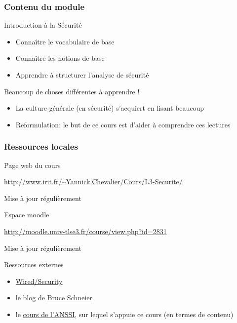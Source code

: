 \begin{reveals}
\begin{frame}
  \frametitle{Contenu du module}

  \vfill
  
  \begin{block}{Introduction à la Sécurité}
    \begin{itemize}
    \item Connaître le vocabulaire de base
    \item Connaître les notions de base 
    \item Apprendre à structurer l'analyse de sécurité
    \end{itemize}
  \end{block}

  \vfill

  \begin{block}{Beaucoup de choses différentes à apprendre !}
    \begin{itemize}
    \item La culture générale (en sécurité) s'acquiert en lisant beaucoup
    \item Reformulation: le but de ce cours est d'aider à comprendre ces lectures 
    \end{itemize}
  \end{block}

\end{frame}


\begin{frame}
  \frametitle{Ressources locales}

  \vfill
  \begin{block}{Page web du cours}
    \begin{center}
      \url{http://www.irit.fr/~Yannick.Chevalier/Cours/L3-Securite/}
    \end{center}
    Mise à jour régulièrement
  \end{block}
  \vfill

  \begin{block}{Espace moodle}
    \begin{center}
      \url{http://moodle.univ-tlse3.fr/course/view.php?id=2831}
    \end{center}
    Mise à jour régulièrement
  \end{block}

  \vfill

  \begin{block}{Ressources externes}
    \begin{itemize}
    \item  \href{https://www.wired.com/category/security/}{Wired/Security}
    \item le blog de \href{https://www.schneier.com/}{Bruce Schneier}
    \item le
      \href{https://www.ssi.gouv.fr/administration/formations/cyberedu/}{cours
        de l'ANSSI}, sur lequel s'appuie ce cours (en termes de
      contenu)
    \end{itemize}
  \end{block}

\end{frame}




\end{reveals}

